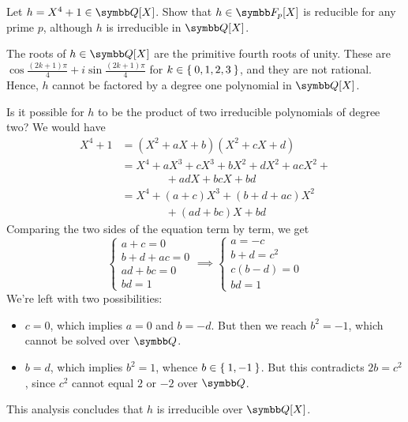 \begin{exercise}
Let \(h = X^4 + 1 \in \rationals[X]\). Show that \(h \in \finitefield{p}[X]\) is reducible for any prime \(p\), although \(h\) is irreducible in \(\rationals[X]\).
\end{exercise}
\begin{solution}
The roots of \(h \in \rationals[X]\) are the primitive fourth roots of unity. These are \(\cos \frac{(2k + 1) \pi}{4} + i \sin \frac{(2k + 1) \pi}{4}\) for \(k \in \Set{0, 1, 2, 3}\), and they are not rational. Hence, \(h\) cannot be factored by a degree one polynomial in \(\rationals[X]\).

Is it possible for \(h\) to be the product of two irreducible polynomials of degree two? We would have
\begin{align*}
    X^4 + 1 &= (X^2 + a X + b) (X^2 + c X + d) \\
    &= X^4 + a X^3 + c X^3 + b X^2 + d X^2 + a c X^2 + \\
    & \hspace{4em} + a d X + b c X + b d \\
    &= X^4 + (a + c) X^3 + (b + d + ac) X^2 \\
    & \hspace{4em} + (ad + bc) X + bd
\end{align*}
Comparing the two sides of the equation term by term, we get
\[
\begin{cases}
    a + c = 0 \\
    b + d + ac = 0 \\
    ad + bc = 0 \\
    bd = 1
\end{cases}
\implies
\begin{cases}
    a = -c \\
    b + d = c^2 \\
    c (b - d) = 0 \\
    bd = 1
\end{cases}
\]
We're left with two possibilities:
\begin{itemize}
    \item \(c = 0\), which implies \(a = 0\) and \(b = -d\). But then we reach \(b^2 = -1\), which cannot be solved over \(\rationals\).

    \item \(b = d\), which implies \(b^2 = 1\), whence \(b \in \Set{ 1, -1 }\). But this contradicts \(2b = c^2\), since \(c^2\) cannot equal \(2\) or \(-2\) over \(\rationals\).
\end{itemize}
This analysis concludes that \(h\) is irreducible over \(\rationals[X]\).


\end{solution}
